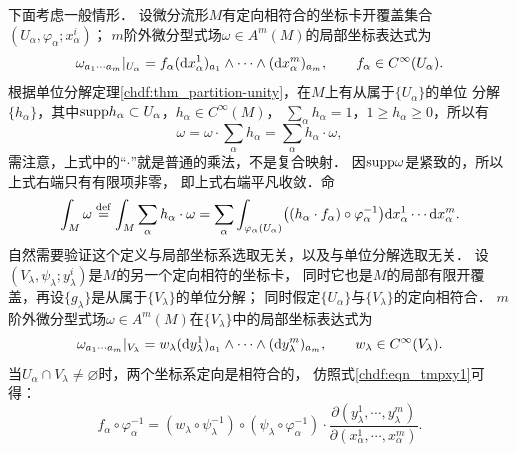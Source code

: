 
下面考虑一般情形．
设微分流形$M$有定向相符合的坐标卡开覆盖集合$(U_\alpha,\varphi_\alpha;x^i_\alpha)$；
$m$阶外微分型式场$\omega \in A^m(M)$的局部坐标表达式为
\begin{equation}
    \omega_{a_1 \cdots a_m}|_{U_\alpha} = f_{\alpha} ({\rm d}x^1_{\alpha})_{a_1}
       \wedge \cdots \wedge({\rm d}x^m_{\alpha})_{a_m},  \qquad f_{\alpha}\in C^\infty(U_\alpha).
\end{equation}
根据单位分解定理\ref{chdf:thm_partition-unity}，在$M$上有从属于$\{U_\alpha\}$的单位
分解$\{h_\alpha\}$，其中${\rm supp}h_\alpha \subset U_\alpha$，$h_\alpha \in C^\infty(M)$，
$\sum_{\alpha}h_\alpha =1$，$1 \geqslant h_\alpha \geqslant 0$，所以有
\begin{equation}
    \omega = \omega \cdot \sum_{\alpha} h_\alpha =  \sum_{\alpha}  h_\alpha \cdot \omega,
\end{equation}
需注意，上式中的“$\cdot$”就是普通的乘法，不是复合映射．
因${\rm supp}\omega$是紧致的，所以上式右端只有有限项非零，
即上式右端平凡收敛．命
\begin{equation}\label{chdf:eqn_def-integral-omega-partition}
    \int_{M} \omega \overset{\mathrm {def}}{=} \int_{M} \sum_{\alpha}  h_\alpha \cdot \omega =
    \sum_{\alpha}\int_{\varphi_\alpha(U_\alpha)}
    \bigl( (h_\alpha \cdot f_\alpha )\circ\varphi^{-1}_\alpha\bigr)
    {\rm d}x^1_\alpha \cdots {\rm d}x^m_\alpha .
\end{equation}
自然需要验证这个定义与局部坐标系选取无关，以及与单位分解选取无关．
设$(V_\lambda,\psi_\lambda;y^i_\lambda)$是$M$的另一个定向相符的坐标卡，
同时它也是$M$的局部有限开覆盖，再设$\{g_\lambda\}$是从属于$\{V_\lambda\}$的单位分解；
同时假定$\{U_\alpha\}$与$\{V_\lambda\}$的定向相符合．
$m$阶外微分型式场$\omega \in A^m(M)$在$\{V_\lambda\}$中的局部坐标表达式为
\begin{equation}
    \omega_{a_1 \cdots a_m}|_{V_\lambda} = w_{\lambda} ({\rm d}y^1_{\lambda})_{a_1}
    \wedge \cdots \wedge({\rm d}y^m_{\lambda})_{a_m},  \qquad w_{\lambda}\in C^\infty(V_\lambda).
\end{equation}
当$U_\alpha \cap V_\lambda \neq \varnothing$时，两个坐标系定向是相符合的，
仿照式\eqref{chdf:eqn_tmpxy1}可得：
\begin{equation}\label{chdf:eqn_tmpxayl104}
    f_\alpha\circ\varphi_\alpha^{-1} = (w_\lambda \circ \psi^{-1}_\lambda )
      \circ (\psi_\lambda \circ \varphi^{-1}_\alpha)\cdot
    \frac{\partial (y^1_\lambda,\cdots, y^m_\lambda)}
    {\partial (x^1_\alpha, \cdots, x^m_\alpha)} .
\end{equation}
